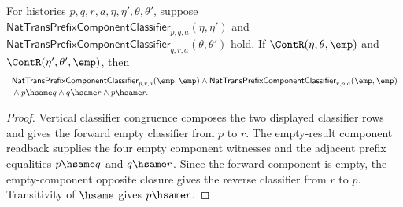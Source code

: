 \begin{theorem}
\label{thm:nattrans-prefix-component-classifier-vert-comp-empty-result-cycle-closed}
For histories $p,q,r,a,\eta,\eta',\theta,\theta'$, suppose
$\mathsf{NatTransPrefixComponentClassifier}_{p,q,a}(\eta,\eta')$ and
$\mathsf{NatTransPrefixComponentClassifier}_{q,r,a}(\theta,\theta')$ hold.
If $\ContR(\eta,\theta,\emp)$ and $\ContR(\eta',\theta',\emp)$, then
$$
\begin{array}{l}
\mathsf{NatTransPrefixComponentClassifier}_{p,r,a}(\emp,\emp)\land
\mathsf{NatTransPrefixComponentClassifier}_{r,p,a}(\emp,\emp)\\[2pt]
{}\land p\hsame q\land q\hsame r\land p\hsame r.
\end{array}
$$
\end{theorem}
\begin{proof}
Vertical classifier congruence composes the two displayed classifier rows and
gives the forward empty classifier from $p$ to $r$. The empty-result component
readback supplies the four empty component witnesses and the adjacent prefix
equalities $p\hsame q$ and $q\hsame r$. Since the forward component is empty,
the empty-component opposite closure gives the reverse classifier from $r$ to
$p$. Transitivity of $\hsame$ gives $p\hsame r$.
\end{proof}


